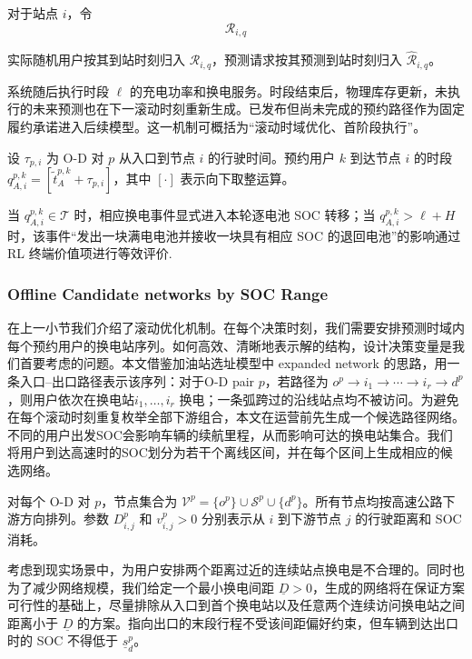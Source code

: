 \documentclass[12pt,a4paper,UTF8]{ctexart}
\begin{document}
对于站点 $i$，令
\begin{equation}
\mathcal R_{i,q}
\end{equation}

实际随机用户按其到站时刻归入 $\mathcal R_{i,q}$，预测请求按其预测到站时刻归入 $\widehat{\mathcal R}_{i,q}$。

系统随后执行时段 $\ell$ 的充电功率和换电服务。时段结束后，物理库存更新，未执行的未来预测也在下一滚动时刻重新生成。已发布但尚未完成的预约路径作为固定履约承诺进入后续模型。这一机制可概括为“滚动时域优化、首阶段执行”。

设 $\tau_{p,i}$ 为 O-D 对 $p$ 从入口到节点 $i$ 的行驶时间。预约用户 $k$ 到达节点 $i$ 的时段 $q_{A,i}^{p,k}=[\widetilde t_{A}^{p,k}+\tau_{p,i}]$，其中 $[\cdot]$ 表示向下取整运算。

当 $q_{A,i}^{p,k}\in\mathcal T$ 时，相应换电事件显式进入本轮逐电池 SOC 转移；当 $q_{A,i}^{p,k}>\ell+H$ 时，该事件“发出一块满电电池并接收一块具有相应 SOC 的退回电池”的影响通过 RL 终端价值项进行等效评价.


\subsubsection{Offline Candidate networks by SOC Range}

在上一小节我们介绍了滚动优化机制。在每个决策时刻，我们需要安排预测时域内每个预约用户的换电站序列。如何高效、清晰地表示解的结构，设计决策变量是我们首要考虑的问题。本文借鉴加油站选址模型中 expanded network 的思路，用一条入口--出口路径表示该序列：对于O-D pair $p$，若路径为
$o^p\rightarrow i_1\rightarrow\cdots\rightarrow i_r\rightarrow d^p$，则用户依次在换电站$i_1,\ldots,i_r$ 换电；一条弧跨过的沿线站点均不被访问。为避免在每个滚动时刻重复枚举全部下游组合，本文在运营前先生成一个候选路径网络。不同的用户出发SOC会影响车辆的续航里程，从而影响可达的换电站集合。我们将用户到达高速时的SOC划分为若干个离线区间，并在每个区间上生成相应的候选网络。

对每个 O-D 对 $p$，节点集合为
$\mathcal V^p=\{o^p\}\cup\mathcal S^p\cup\{d^p\}$。所有节点均按高速公路下游方向排列。参数 $D_{i,j}^p$ 和 $v_{i,j}^p>0$ 分别表示从 $i$ 到下游节点 $j$ 的行驶距离和 SOC 消耗。

考虑到现实场景中，为用户安排两个距离过近的连续站点换电是不合理的。同时也为了减少网络规模，我们给定一个最小换电间距 $\underline D>0$，生成的网络将在保证方案可行性的基础上，尽量排除从入口到首个换电站以及任意两个连续访问换电站之间距离小于 $\underline D$ 的方案。指向出口的末段行程不受该间距偏好约束，但车辆到达出口时的 SOC 不得低于 $\underline s_d^p$。
\end{document}
